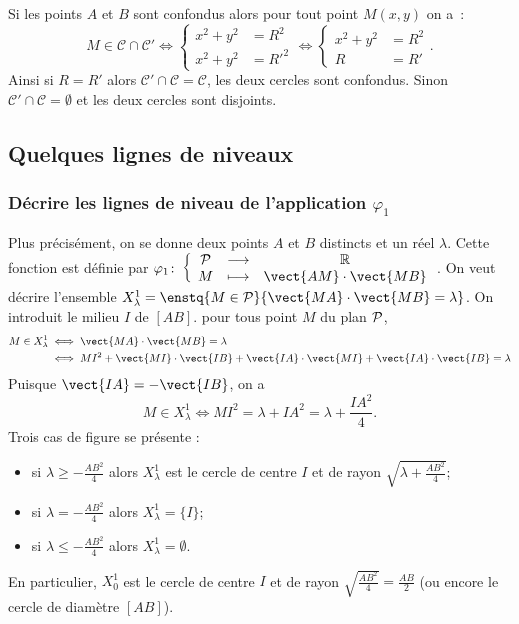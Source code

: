 Si les points $A$ et $B$ sont confondus alors pour tout point $M(x,y)$ on a~:
\begin{equation}
  M \in \mathcal{C} \cap \mathcal{C}' \iff \begin{cases} x^2+y^2 & =R^2 \\ x^2+y^2&=R'^2 \end{cases} \iff \begin{cases} x^2+y^2 & =R^2 \\ R&=R' \end{cases}.
\end{equation}
Ainsi si $R=R'$ alors $\mathcal{C}' \cap \mathcal{C}=\mathcal{C}$, les deux cercles sont confondus. Sinon $\mathcal{C}' \cap \mathcal{C}=\emptyset$ et les deux cercles sont disjoints.

\subsection{Quelques lignes de niveaux}
\subsubsection{Décrire les lignes de niveau de l'application $\varphi_1$}
Plus précisément, on se  donne deux points $A$ et $B$ distincts et un réel $\lambda$. Cette fonction est définie par $\fonction{\varphi_1}{\P}{\R}{M}{\vect{AM} \cdot \vect{MB}}$. On veut décrire l'ensemble $X_{\lambda}^{1}=\enstq{M \in \P}{\vect{MA} \cdot \vect{MB} = \lambda}$. On introduit le milieu $I$ de $[AB]$. pour tous point $M$ du plan $\P$,
\begin{align}
  M \in X_{\lambda}^{1} & \iff \vect{MA} \cdot \vect{MB} = \lambda \\ & \iff MI^2 + \vect{MI} \cdot \vect{IB} + \vect{IA} \cdot \vect{MI} + \vect{IA} \cdot \vect{IB} = \lambda
\end{align}
Puisque $\vect{IA}=-\vect{IB}$, on a 
\begin{equation}
  M \in X_{\lambda}^{1}  \iff MI^2=\lambda + IA^2=\lambda + \frac{IA^2}{4}.
\end{equation}
Trois cas de figure se présente :
\begin{itemize}
\item si $\lambda \geq -\frac{AB^2}{4}$ alors $X_{\lambda}^{1}$ est le cercle de centre $I$ et de rayon $\sqrt{\lambda +\frac{AB^2}{4}}$;
\item si $\lambda = -\frac{AB^2}{4}$ alors $X_{\lambda}^{1}=\{I\}$;
\item si $\lambda \leq -\frac{AB^2}{4}$ alors $X_{\lambda}^{1}=\emptyset$.
\end{itemize}
En particulier, $X_{0}^{1}$ est le cercle de centre $I$ et de rayon $\sqrt{\frac{AB^2}{4}}=\frac{AB}{2}$ (ou encore le cercle de diamètre $[AB]$).

